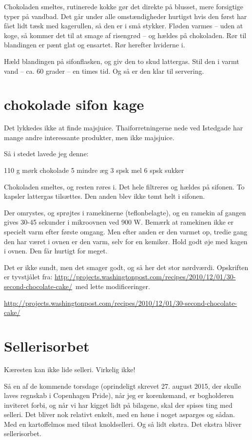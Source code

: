 \documentclass[
]{book}
\begin{document}
Chokoladen smeltes, rutinerede kokke gør det direkte på blusset, mere forsigtige typer på vandbad. Det går under alle omstændigheder hurtigst hvis den først har fået lidt tæsk med kagerullen, så den er i små stykker. Fløden varmes -- uden at koge, så kommer det til at smage af risengrød -- og hældes på chokoladen. Rør til blandingen er pænt glat og ensartet. Rør herefter hviderne i.

Hæld blandingen på sifonflasken, og giv den to skud lattergas. Stil den i varmt vand -- ca. 60 grader -- en times tid. Og så er den klar til servering.

\hypertarget{chokolade-sifon-kage}{%
\section{chokolade sifon kage}\label{chokolade-sifon-kage}}

Det lykkedes ikke at finde majsjuice. Thaiforretningerne nede ved Istedgade har mange andre interessante produkter, men ikke majsjuice.

Så i stedet lavede jeg denne:

110 g mørk chokolade
5 mindre æg
3 spsk mel
6 spsk sukker

Chokoladen smeltes, og resten røres i. Det hele filtreres og hældes på sifonen. To kapsler lattergas tilsættes. Den anden blev ikke tømt helt i sifonen.

Der omrystes, og sprøjtes i ramekinerne (teflonbelagte), og en ramekin af gangen gives 30-45 sekunder i mikroovnen ved 900 W. Bemærk at ramekinen ikke er specielt varm efter første omgang. Men efter anden er den varmet op, tredie gang den har været i ovnen er den varm, selv for en kemiker. Hold godt øje med kagen i ovnen. Den får hurtigt for meget.

Det er ikke sundt, men det smager godt, og så her det stor nørdværdi. Opskriften er tyvstjålet fra: \url{http://projects.washingtonpost.com/recipes/2010/12/01/30-second-chocolate-cake/}~med lette modificeringer.

\url{http://projects.washingtonpost.com/recipes/2010/12/01/30-second-chocolate-cake/}

\hypertarget{sellerisorbet}{%
\section{Sellerisorbet}\label{sellerisorbet}}

Kæresten kan ikke lide selleri. Virkelig ikke!

Så en af de kommende torsdage (oprindeligt skrevet 27. august 2015, der skulle laves regnskab i Copenhagen Pride), når jeg er korenkemand, er bogholderen inviteret forbi, og når vi har kigget lidt på bilagene, skal der spises ting med selleri. Det bliver nok relativt enkelt, med en høne i noget asparges og sådan. Med en kartoffelmos med tilsat knoldselleri. Og så lidt ekstra. Det ekstra bliver sellerisorbet.
\end{document}
